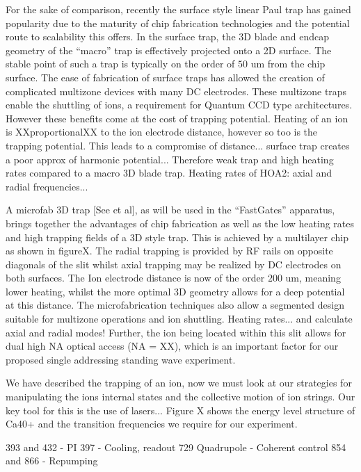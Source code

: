 For the sake of comparison, recently the surface style linear Paul
trap has gained popularity due to the maturity of chip fabrication
technologies and the potential route to scalability this offers. In
the surface trap, the 3D blade and endcap geometry of the ``macro''
trap is effectively projected onto a 2D surface. The stable point of
such a trap is typically on the order of $50$ um from the chip
surface. The ease of fabrication of surface traps has allowed the
creation of complicated multizone devices with many DC electrodes.
These multizone traps enable the shuttling of ions, a requirement for
Quantum CCD type architectures. However these benefits come at the
cost of trapping potential. Heating of an ion is XXproportionalXX to
the ion electrode distance, however so too is the trapping
potential. This leads to a compromise of distance... surface trap
creates a poor approx of harmonic potential... Therefore weak trap and
high heating rates compared to a macro 3D blade trap. Heating rates of
HOA2: axial and radial frequencies...

A microfab 3D trap [See et al], as will be used in the ``FastGates''
apparatus, brings together the advantages of chip fabrication as well
as the low heating rates and high trapping fields of a 3D style
trap. This is achieved by a multilayer chip as shown in figureX. The
radial trapping is provided by RF rails on opposite diagonals of the
slit whilst axial trapping may be realized by DC electrodes on both
surfaces. The Ion electrode distance is now of the order $200$ um,
meaning lower heating, whilst the more optimal 3D geometry allows for
a deep potential at this distance. The microfabrication techniques
also allow a segmented design suitable for multizone operations and
ion shuttling. Heating rates... and calculate axial and radial modes!
Further, the ion being located within this slit allows for dual high
NA optical access (NA = XX), which is an important factor for our
proposed single addressing standing wave experiment.

\subtitle{Laser systems}
We have described the trapping of an ion, now we must look at our strategies for manipulating the ions internal states and the collective motion of ion strings. Our key tool for this is the use of lasers...
Figure X shows the energy level structure of Ca40+ and the transition frequencies we require for our experiment.

393 and 432 - PI 
397 - Cooling, readout
729 Quadrupole - Coherent control
854 and 866 - Repumping

\subtitle{The vacuum system}


